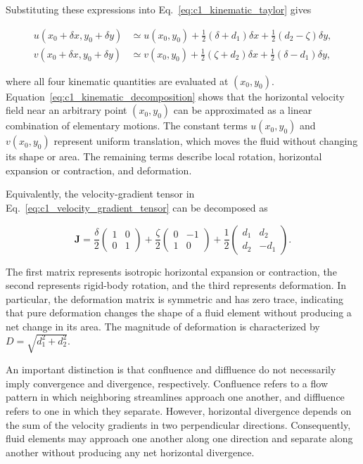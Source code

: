 \documentclass[10pt,twocolumn]{memoir}
\begin{document}
Substituting these expressions into Eq.~\ref{eq:c1_kinematic_taylor} gives

\begin{equation}
\begin{aligned}
    u(x_0+\delta x,y_0+\delta y) &\simeq u(x_0,y_0)+\frac{1}{2}(\delta+d_1)\delta x+\frac{1}{2}(d_2-\zeta)\delta y,\\
    v(x_0+\delta x,y_0+\delta y) &\simeq v(x_0,y_0)+\frac{1}{2}(\zeta+d_2)\delta x+\frac{1}{2}(\delta-d_1)\delta y,
\end{aligned}
\label{eq:c1_kinematic_decomposition}
\end{equation}

where all four kinematic quantities are evaluated at $(x_0,y_0)$. Equation~\ref{eq:c1_kinematic_decomposition} shows that the horizontal velocity field near an arbitrary point $(x_0,y_0)$ can be approximated as a linear combination of elementary motions. The constant terms $u(x_0,y_0)$ and $v(x_0,y_0)$ represent uniform translation, which moves the fluid without changing its shape or area. The remaining terms describe local rotation, horizontal expansion or contraction, and deformation.

Equivalently, the velocity-gradient tensor in Eq.~\ref{eq:c1_velocity_gradient_tensor} can be decomposed as

\begin{equation}
    \mathbf{J}
    =\frac{\delta}{2}
    \begin{pmatrix}1&0\\0&1\end{pmatrix}
    +\frac{\zeta}{2}
    \begin{pmatrix}0&-1\\1&0\end{pmatrix}
    +\frac{1}{2}
    \begin{pmatrix}d_1&d_2\\d_2&-d_1\end{pmatrix}.
\label{eq:c1_velocity_gradient_decomposition}
\end{equation}

The first matrix represents isotropic horizontal expansion or contraction, the second represents rigid-body rotation, and the third represents deformation. In particular, the deformation matrix is symmetric and has zero trace, indicating that pure deformation changes the shape of a fluid element without producing a net change in its area. The magnitude of deformation is characterized by $D=\sqrt{d_1^2+d_2^2}$.

An important distinction is that confluence and diffluence do not necessarily imply convergence and divergence, respectively. Confluence refers to a flow pattern in which neighboring streamlines approach one another, and diffluence refers to one in which they separate. However, horizontal divergence depends on the sum of the velocity gradients in two perpendicular directions. Consequently, fluid elements may approach one another along one direction and separate along another without producing any net horizontal divergence.
\end{document}
